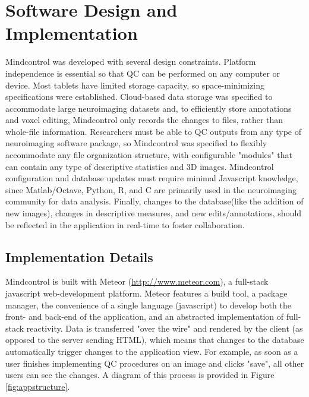 \section{Software Design and Implementation}

Mindcontrol was developed with several design constraints. Platform independence is essential so that QC can be performed on any computer or device. Most tablets have limited storage capacity, so space-minimizing specifications were established. Cloud-based data storage was specified to accommodate large neuroimaging datasets and, to efficiently store annotations and voxel editing, Mindcontrol only records the changes to files, rather than whole-file information. Researchers must be able to QC outputs from any type of neuroimaging software package, so Mindcontrol was specified to flexibly accommodate any file organization structure, with configurable "modules" that can contain any type of descriptive statistics and 3D images. Mindcontrol configuration and database updates must require minimal Javascript knowledge, since Matlab/Octave, Python, R, and C are primarily used in the neuroimaging community for data analysis. Finally, changes to the database(like the addition of new images), changes in descriptive measures, and new edits/annotations, should be reflected in the application in real-time to foster collaboration.  


\subsection{Implementation Details}

Mindcontrol is built with Meteor (\href{http://www.meteor.com}{http://www.meteor.com}), a full-stack javascript web-development platform. Meteor features a build tool, a package manager, the convenience of a single language (javascript) to develop both the front- and back-end of the application, and an abstracted implementation of full-stack reactivity. Data is transferred "over the wire" and rendered by the client (as opposed to the server sending HTML), which means that changes to the database automatically trigger changes to the application view. For example, as soon as a user finishes implementing QC procedures on an image and clicks "save", all other users can see the changes. A diagram of this process is provided in Figure \ref{fig:appstructure}.



